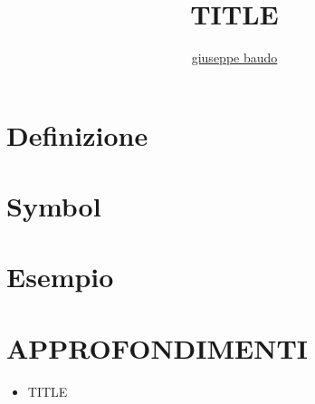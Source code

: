 \documentclass[a4paper,10pt]{article}
\title{TITLE}
\author{\href{http://www.baudo.hol.es}{giuseppe baudo}}
\begin{document}
\maketitle

\section{Definizione}

\section{Symbol}

\section{Esempio}

\section{APPROFONDIMENTI}
\begin{itemize}
 \item TITLE
\end{itemize}
\end{document}
